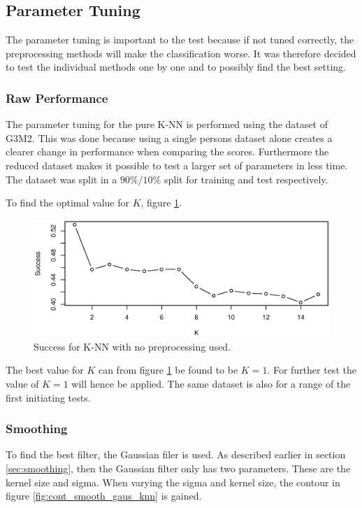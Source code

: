 \subsection{Parameter Tuning}
The parameter tuning is important to the test because if not tuned correctly, the preprocessing methods will make the classification worse.
It was therefore decided to test the individual methods one by one and to possibly find the best setting.

\subsubsection{Raw Performance}
The parameter tuning for the pure K-NN is performed using the dataset of G3M2.
This was done because using a single persons dataset alone creates a clearer change in performance when comparing the scores.
Furthermore the reduced dataset makes it possible to test a larger set of parameters in less time.
The dataset was split in a $90\%/10\%$ split for training and test respectively.

To find the optimal value for $K$, figure \ref{fig:k_success}.

\begin{figure}[H]
\centering
\includegraphics[width = 0.95 \textwidth]{graphics/knn_raw_success}
\caption{Success for K-NN with no preprocessing used.}
\label{fig:k_success}
\end{figure}

The best value for $K$ can from figure \ref{fig:k_success} be found to be $K = 1$.
For further test the value of $K = 1$ will hence be applied.
The same dataset is also for a range of the first initiating tests.


\subsubsection{Smoothing}
\label{sec:knn_smooth}
To find the best filter, the Gaussian filer is used.
As described earlier in section \ref{sec:smoothing}, then the Gaussian filter only has two parameters.
These are the kernel size and sigma.
When varying the sigma and kernel size, the contour in figure \ref{fig:cont_smooth_gaus_knn} is gained.

